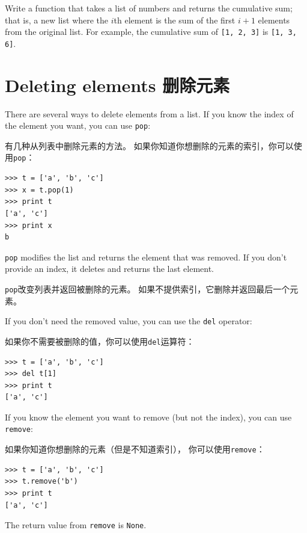 \documentclass[10pt]{book}
\begin{document}
\begin{CJK}{UTF8}{gbsn}
\begin{exercise}
\label{cumulative}

Write a function that takes a list of numbers and returns the
cumulative sum; that is, a new list where the $i$th element
is the sum of the first $i+1$ elements from the original list.
For example, the cumulative sum of {\tt [1, 2, 3]} is
{\tt [1, 3, 6]}. 
\end{exercise}


\section{Deleting elements 删除元素}

There are several ways to delete elements from a list.  If you
know the index of the element you want, you can use
{\tt pop}:

有几种从列表中删除元素的方法。
如果你知道你想删除的元素的索引，你可以使用{\tt pop}：

\begin{verbatim}
>>> t = ['a', 'b', 'c']
>>> x = t.pop(1)
>>> print t
['a', 'c']
>>> print x
b
\end{verbatim}
%
{\tt pop} modifies the list and returns the element that was removed.
If you don't provide an index, it deletes and returns the
last element.

{\tt pop}改变列表并返回被删除的元素。
如果不提供索引，它删除并返回最后一个元素。

If you don't need the removed value, you can use the {\tt del}
operator:

如果你不需要被删除的值，你可以使用{\tt del}运算符：

\begin{verbatim}
>>> t = ['a', 'b', 'c']
>>> del t[1]
>>> print t
['a', 'c']
\end{verbatim}
%

If you know the element you want to remove (but not the index), you
can use {\tt remove}:

如果你知道你想删除的元素（但是不知道索引），
你可以使用{\tt remove}：

\begin{verbatim}
>>> t = ['a', 'b', 'c']
>>> t.remove('b')
>>> print t
['a', 'c']
\end{verbatim}
%
The return value from {\tt remove} is {\tt None}.


\end{CJK}
\end{document}
